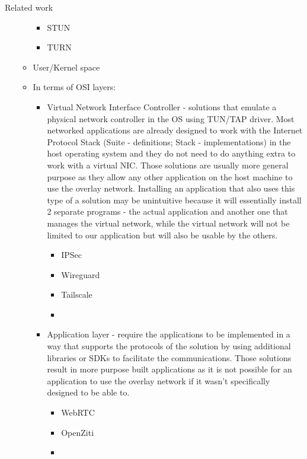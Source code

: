 \begin{frame}{Related work}
\begin{itemize}
\begin{itemize}
    \begin{itemize}
    \tightlist
    \item
      STUN
    \item
      TURN
    \end{itemize}
  \item
    User/Kernel space
  \item
    In terms of OSI layers:

    \begin{itemize}
    \tightlist
    \item
      Virtual Network Interface Controller - solutions that emulate a
      physical network controller in the OS using TUN/TAP driver. Most
      networked applications are already designed to work with the
      Internet Protocol Stack (Suite - definitions; Stack -
      implementations) in the host operating system and they do not need
      to do anything extra to work with a virtual NIC. Those solutions
      are usually more general purpose as they allow any other
      application on the host machine to use the overlay network.
      Installing an application that also uses this type of a solution
      may be unintuitive because it will essentially install 2 separate
      programs - the actual application and another one that manages the
      virtual network, while the virtual network will not be limited to
      our application but will also be usable by the others.

      \begin{itemize}
      \tightlist
      \item
        IPSec
      \item
        Wireguard
      \item
        Tailscale
      \item
      \end{itemize}
    \item
      Application layer - require the applications to be implemented in
      a way that supports the protocols of the solution by using
      additional libraries or SDKs to facilitate the communications.
      Those solutions result in more purpose built applications as it is
      not possible for an application to use the overlay network if it
      wasn't specifically designed to be able to.

      \begin{itemize}
      \tightlist
      \item
        WebRTC
      \item
        OpenZiti
      \item
      \end{itemize}
    \end{itemize}
  \end{itemize}
\end{itemize}
\end{frame}

